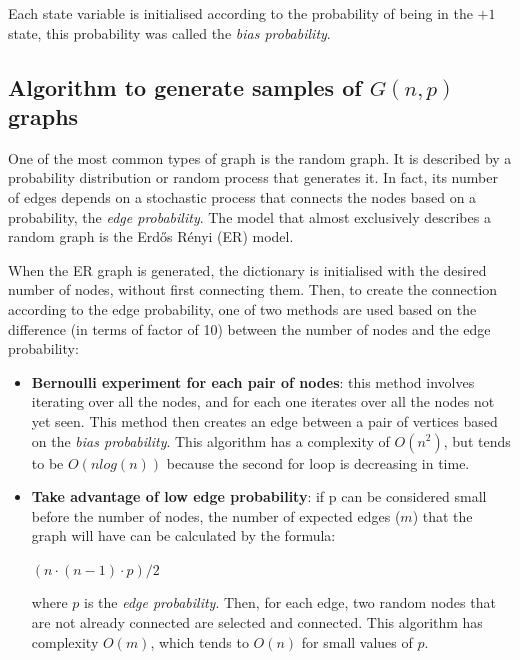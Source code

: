 \documentclass[conference]{IEEEtran}
\begin{document}
        Each state variable is initialised according to the probability of being in the $+1$ state, this probability was called the \textit{bias probability}. 

    \subsection{Algorithm to generate samples of $G(n,p)$ graphs}
    
        One of the most common types of graph is the random graph. 
        It is described by a probability distribution or random process that generates it. 
        In fact, its number of edges depends on a stochastic process that connects the nodes based on a probability, the \textit{edge probability}. 
        The model that almost exclusively describes a random graph is the Erdős Rényi (ER) model. 

        When the ER graph is generated, the dictionary is initialised with the desired number of nodes, without first connecting them. 
        Then, to create the connection according to the edge probability, one of two methods are used based on the difference (in terms of factor of 10) between the number of nodes and the edge probability:
        \begin{itemize}
            \item \textbf{Bernoulli experiment for each pair of nodes}: this method involves iterating over all the nodes, and for each one iterates over all the nodes not yet seen. 
            This method then creates an edge between a pair of vertices based on the \textit{bias probability}.
            This algorithm has a complexity of $O(n^2)$, but tends to be $O(nlog(n))$ because the second for loop is decreasing in time.

            \item \textbf{Take advantage of low edge probability}: if p can be considered small before the number of nodes, the number of expected edges ($m$) that the graph will have can be calculated by the formula:
            \begin{center}
                \begin{math}
                    (n \cdot (n-1)\cdot p)/2 
                \end{math}            
            \end{center}        
            where $p$ is the \textit{edge probability}. 
            Then, for each edge, two random nodes that are not already connected are selected and connected.
            This algorithm has complexity $O(m)$, which tends to $O(n)$ for small values of $p$.
        \end{itemize}
\end{document}

